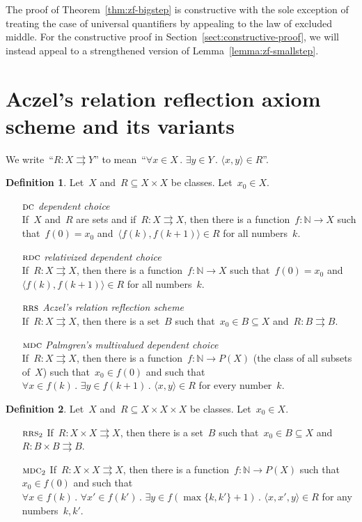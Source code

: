 \documentclass[oneside,reqno]{amsart}
\theoremstyle{definition}
\newtheorem{defn}{Definition}[section]
\theoremstyle{plain}
\theoremstyle{remark}
\newcommand{\NN}{\mathbb{N}}
\renewcommand{\_}{\mathpunct{.}\,}
\newcommand{\?}{\,{:}\,}
\newcommand{\RRS}{\textsc{rrs}}
\newcommand{\RDC}{\textsc{rdc}}
\newcommand{\DC}{\textsc{dc}}
\newcommand{\MDC}{\textsc{mdc}}
\begin{document}
The proof of Theorem~\ref{thm:zf-bigstep} is constructive with the sole
exception of treating the case of universal quantifiers by appealing to the law
of excluded middle. For the constructive proof in
Section~\ref{sect:constructive-proof}, we will instead appeal to a strengthened
version of Lemma~\ref{lemma:zf-smallstep}.


\section{Aczel's relation reflection axiom scheme and its variants}
\label{sect:axioms}

We write~``$R : X \rightrightarrows Y$'' to mean~``$\forall x \in X\_ \exists y
\in Y\_ \langle x,y \rangle \in R$''.

\begin{defn}Let~$X$ and~$R \subseteq X \times X$ be classes. Let~$x_0 \in X$.
\begin{itemize}
\setlength{\itemsep}{0.3em}
\item[$\DC$] \emph{dependent choice} \\ If~$X$ and~$R$ are sets and
if~$R : X \rightrightarrows X$, then there is a function~$f : \NN \to X$ such that~$f(0) =
x_0$ and~$\langle f(k), f(k+1) \rangle \in R$ for all numbers~$k$.
\item[$\RDC$] \emph{relativized dependent choice} \\ If~$R : X
\rightrightarrows X$, then there is a function~$f : \NN \to X$ such that~$f(0)
= x_0$ and~$\langle f(k), f(k+1) \rangle \in R$ for all numbers~$k$.
\item[$\RRS$] \emph{Aczel's relation reflection scheme} \\
If~$R : X \rightrightarrows X$, then there is
a set~$B$ such that~$x_0 \in B \subseteq X$ and~$R : B \rightrightarrows B$.
\item[$\MDC$] \emph{Palmgren's multivalued dependent choice} \\
If~$R : X \rightrightarrows X$, then there is a function~$f : \NN \to P(X)$
(the class of all subsets of~$X$) such that~$x_0 \in f(0)$ and such
that~$\forall x \in f(k)\_ \exists y \in f(k+1)\_ \langle x,y \rangle \in R$
for every number~$k$.
\end{itemize}
\end{defn}

\begin{defn}\label{defn:rrs2}
Let~$X$ and~$R \subseteq X \times X \times X$ be classes. Let~$x_0 \in X$.
\begin{itemize}
\setlength{\itemsep}{0.3em}
\item[$\RRS_2$]
If~$R : X \times X \rightrightarrows X$, then there is a set~$B$ such that~$x_0
\in B \subseteq X$ and~$R : B \times B \rightrightarrows B$.
\item[$\MDC_2$]
If~$R : X \times X \rightrightarrows X$, then there is a function~$f : \NN \to
P(X)$ such that~$x_0 \in f(0)$ and such that~$\forall x \in f(k)\_ \forall x'
\in f(k')\_ \exists y \in f(\max\{k,k'\}+1)\_ \langle x,x',y \rangle \in R$ for
any numbers~$k, k'$.
\end{itemize}
\end{defn}
\end{document}
